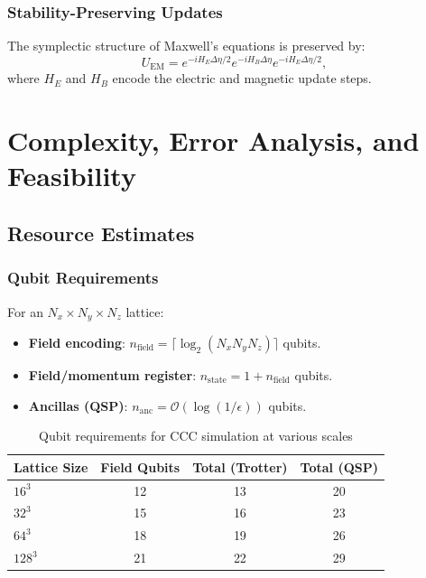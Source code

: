 \documentclass[11pt,a4paper]{article}
\newcommand{\Order}{\mathcal{O}}
\theoremstyle{plain}
\theoremstyle{definition}
\theoremstyle{remark}
\begin{document}
\subsubsection{Stability-Preserving Updates}

The symplectic structure of Maxwell's equations is preserved by:
\begin{equation}
    U_{\text{EM}} = e^{-iH_E \Delta\eta/2} e^{-iH_B \Delta\eta} e^{-iH_E \Delta\eta/2},
\end{equation}
where $H_E$ and $H_B$ encode the electric and magnetic update steps.

\section{Complexity, Error Analysis, and Feasibility}\label{sec:complexity}

\subsection{Resource Estimates}\label{subsec:resources}

\subsubsection{Qubit Requirements}

For an $N_x \times N_y \times N_z$ lattice:
\begin{itemize}
    \item \textbf{Field encoding}: $n_{\text{field}} = \lceil\log_2(N_x N_y N_z)\rceil$ qubits.
    \item \textbf{Field/momentum register}: $n_{\text{state}} = 1 + n_{\text{field}}$ qubits.
    \item \textbf{Ancillas (QSP)}: $n_{\text{anc}} = \Order(\log(1/\epsilon))$ qubits.
\end{itemize}

\begin{table}[h]
\centering
\caption{Qubit requirements for CCC simulation at various scales}
\label{tab:qubit_requirements}
\begin{tabular}{lccc}
\toprule
\textbf{Lattice Size} & \textbf{Field Qubits} & \textbf{Total (Trotter)} & \textbf{Total (QSP)} \\
\midrule
$16^3$ & 12 & 13 & 20 \\
$32^3$ & 15 & 16 & 23 \\
$64^3$ & 18 & 19 & 26 \\
$128^3$ & 21 & 22 & 29 \\
\bottomrule
\end{tabular}
\end{table}
\end{document}
